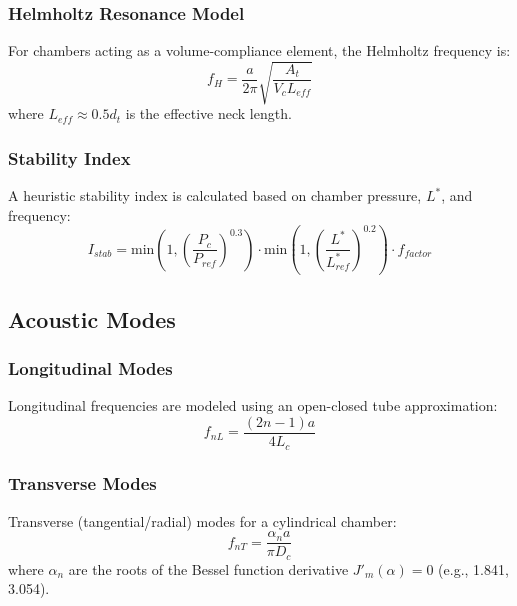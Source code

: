 \subsubsection{Helmholtz Resonance Model}
For chambers acting as a volume-compliance element, the Helmholtz frequency is:
\begin{equation}
f_H = \frac{a}{2\pi} \sqrt{\frac{A_t}{V_c L_{eff}}}
\end{equation}
where \(L_{eff} \approx 0.5 d_t\) is the effective neck length.

\subsubsection{Stability Index}
A heuristic stability index is calculated based on chamber pressure, \(L^*\), and frequency:
\begin{equation}
I_{stab} = \text{min}\left(1, \left(\frac{P_c}{P_{ref}}\right)^{0.3}\right) \cdot \text{min}\left(1, \left(\frac{L^*}{L^*_{ref}}\right)^{0.2}\right) \cdot f_{factor}
\end{equation}

\subsection{Acoustic Modes}

\subsubsection{Longitudinal Modes}
Longitudinal frequencies are modeled using an open-closed tube approximation:
\begin{equation}
f_{nL} = \frac{(2n-1) a}{4 L_c}
\end{equation}

\subsubsection{Transverse Modes}
Transverse (tangential/radial) modes for a cylindrical chamber:
\begin{equation}
f_{nT} = \frac{\alpha_n a}{\pi D_c}
\end{equation}
where \(\alpha_n\) are the roots of the Bessel function derivative \(J'_m(\alpha) = 0\) (e.g., 1.841, 3.054).

